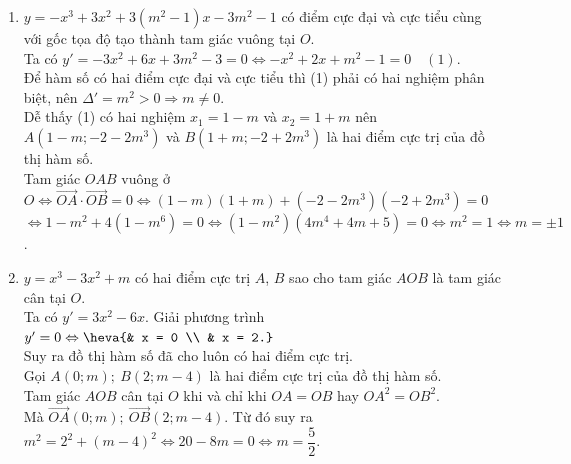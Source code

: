 \begin{bt}
{\begin{enumerate}
\begin{eqnarray*}
			\end{eqnarray*}
			Với $m = \dfrac{1}{2}$ thì $BC = \sqrt{(2\sqrt{m})^2 + (4m\sqrt{m})^2} = \sqrt{4m + 16m^3} = \sqrt{4  \cdot \dfrac{1}{2} + 16 \cdot \dfrac{1}{8}} = 2$.\\
			Thử lại thấy ba điểm $A,B,C$  không thẳng hàng.\\
			 Gọi $I$ là trung điểm của $BC$, suy ra $I(0;1)$ và $IA = \sqrt{2^2 + (3 - 1)^2} = 2\sqrt{2}$.\\
			Vậy diện tích tam giác $ABC$ bằng $\dfrac{1}{2} \cdot IA \cdot BC  = \dfrac{1}{2} \cdot 2\sqrt{2} \cdot 2 = 2\sqrt{2}$.
			\item $y = -x^3 + 3x^2 + 3(m^2 - 1)x - 3m^2 - 1$ có điểm cực đại và cực tiểu cùng  với gốc tọa độ tạo thành tam giác vuông tại $O$.\\
			Ta có $y'  = -3x^2 + 6x + 3m^2 - 3 = 0 \Leftrightarrow -x^2 + 2x + m^2 - 1 = 0 \quad(1)$.\\
			Để hàm số có hai điểm cực đại và cực tiểu thì (1) phải  có hai nghiệm phân biệt, nên $\Delta' = m^2 > 0 \Rightarrow m \ne 0$.\\
			Dễ thấy (1) có hai nghiệm $x_1 = 1 - m$ và $x_2 = 1 + m$ nên $A(1 - m; -2 - 2m^3)$ và $B(1 + m; -2 + 2m^3)$  là hai điểm cực trị của đồ thị hàm số.\\
			Tam giác $OAB$ vuông ở $O \Leftrightarrow \overrightarrow{OA} \cdot \overrightarrow{OB} = 0 \Leftrightarrow (1 -  m)(1 + m) + (-2 - 2m^3)(-2 + 2m^3) = 0$\\
			$\Leftrightarrow 1 - m^2 + 4(1 - m^6) = 0 \Leftrightarrow (1 - m^2)(4m^4  + 4m + 5) = 0 \Leftrightarrow m^2 = 1 \Leftrightarrow m = \pm1$.
			\item $y = x^3 - 3x^2 + m$ có hai điểm cực trị  $A$, $B$ sao cho tam giác $AOB$ là tam giác cân tại $O$.\\
			Ta có $y' = 3x^2 - 6x$. Giải phương trình $y'  = 0 \Leftrightarrow \heva{& x = 0 \\ & x = 2.}$\\
			Suy ra đồ thị hàm số  đã cho luôn có hai điểm cực trị.\\
			Gọi $A(0;m);\ B(2;m - 4)$ là hai điểm cực trị của đồ  thị hàm số.\\
			Tam giác $AOB$ cân tại $O$ khi và chỉ khi $OA = OB$ hay  $OA^2 = OB^2$.\\
			Mà $\overrightarrow{OA}(0;m);\ \overrightarrow{OB}(2;m - 4)$. Từ đó suy ra $m^2 = 2^2 + (m - 4)^2 \Leftrightarrow 20 - 8m = 0  \Leftrightarrow m = \dfrac{5}{2}$.
		\end{enumerate}
	 }
\end{bt}

